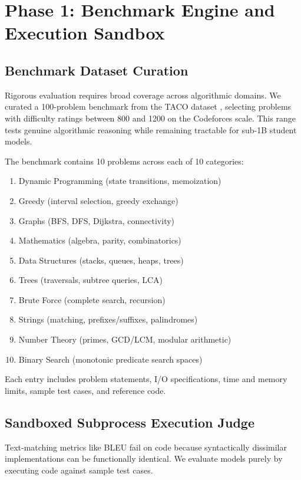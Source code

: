 \documentclass[journal]{IEEEtran}
\begin{document}
\section{Phase 1: Benchmark Engine and Execution Sandbox}
\subsection{Benchmark Dataset Curation}
Rigorous evaluation requires broad coverage across algorithmic domains. We curated a 100-problem benchmark from the TACO dataset \cite{li2023taco}, selecting problems with difficulty ratings between 800 and 1200 on the Codeforces scale. This range tests genuine algorithmic reasoning while remaining tractable for sub-1B student models.

The benchmark contains 10 problems across each of 10 categories:
\begin{enumerate}
    \item Dynamic Programming (state transitions, memoization)
    \item Greedy (interval selection, greedy exchange)
    \item Graphs (BFS, DFS, Dijkstra, connectivity)
    \item Mathematics (algebra, parity, combinatorics)
    \item Data Structures (stacks, queues, heaps, trees)
    \item Trees (traversals, subtree queries, LCA)
    \item Brute Force (complete search, recursion)
    \item Strings (matching, prefixes/suffixes, palindromes)
    \item Number Theory (primes, GCD/LCM, modular arithmetic)
    \item Binary Search (monotonic predicate search spaces)
\end{enumerate}
Each entry includes problem statements, I/O specifications, time and memory limits, sample test cases, and reference code.

\subsection{Sandboxed Subprocess Execution Judge}
Text-matching metrics like BLEU fail on code because syntactically dissimilar implementations can be functionally identical. We evaluate models purely by executing code against sample test cases.
\end{document}
